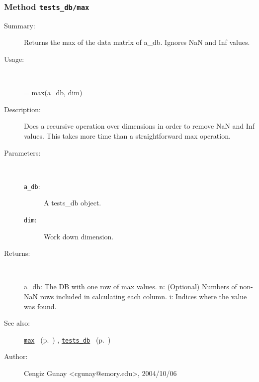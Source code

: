 \subsubsection[Method \texttt{max}]{Method \texttt{tests\_db/max}}%
%
\label{ref_tests_db__max}%
\hypertarget{ref_tests_db__max}{}%
\begin{description}
\item[Summary:]Returns the max of the data matrix of a\_db. Ignores NaN and Inf values.
%
\item[Usage:]~%
\begin{lyxcode}%
[a\_db, n, i] = max(a\_db, dim)
%
\end{lyxcode}%
%
\item[Description:]%
Does a recursive operation over dimensions in order to remove NaN and
 Inf values. This takes more time than a straightforward max operation. 
\item[Parameters:]~
\begin{description}%
\item[\texttt{a\_db}:]
 A tests\_db object.
\item[\texttt{dim}:]
 Work down dimension.
\end{description}%
%
\item[Returns:
]~

   a\_db: The DB with one row of max values.
   n: (Optional) Numbers of non-NaN rows included in calculating
	each column.
   i: Indices where the value was found.
%
%
\item[See also:]%
\hyperlink{ref_max}{\texttt{max}}%
\ (p.~\pageref{ref_max})%
%
, \hyperlink{ref_tests_db}{\texttt{tests\_db}}%
\ (p.~\pageref{ref_tests_db})%
%
%
\item[Author:]%
Cengiz Gunay <cgunay@emory.edu>, 2004/10/06
%
\end{description}
\methodline%
